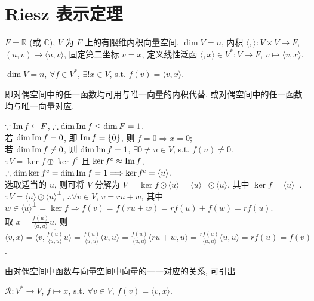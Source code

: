 \documentclass{note}
\begin{document}
\section{Riesz 表示定理}
$F=\mathbb{R}$ (或 $\mathbb{C}$), $V$ 为 $F$ 上的有限维内积向量空间, $\dim V=n$, 内积 $\langle,\rangle:V\times V\rightarrow F$, $(u,v)\mapsto\langle u,v\rangle$, 固定第二坐标 $v=x$, 定义线性泛函 $\langle,x\rangle\in V^*:V\rightarrow F$, $v\mapsto\langle v,x\rangle$.
\begin{thm}\label{thm-9.15}
    $\dim V=n$, $\forall f\in V^*$, $\exists!x\in V$, s.t. $f(v)=\langle v,x\rangle$.
\end{thm}
即对偶空间中的任一函数均可用与唯一向量的内积代替, 或对偶空间中的任一函数均与唯一向量对应.
\begin{pf}
    $\because\operatorname{Im} f\subseteq F$, $\therefore\dim\operatorname{Im} f\leq\dim F=1$.\\
    若 $\dim\operatorname{Im} f=0$, 即 $\operatorname{Im} f=\{0\}$, 则 $f=0\Longrightarrow x=0$;\\
    若 $\dim\operatorname{Im} f\neq 0$, 则 $\dim\operatorname{Im} f=1$, $\exists 0\neq u\in V$, s.t. $f(u)\neq 0$.\\
    $\because V=\ker f\oplus\ker f^c$ 且 $\ker f^c\approx\operatorname{Im} f$, $\therefore\dim\ker f^c=\dim\operatorname{Im} f=1\Longrightarrow\ker f^c=\langle u\rangle$.\\
    选取适当的 $u$, 则可将 $V$ 分解为 $V=\ker f\odot\langle u\rangle=\langle u\rangle^{\perp}\odot\langle u\rangle$, 其中 $\ker f=\langle u\rangle^{\perp}$.\\
    $\because V=\langle u\rangle\odot\langle u\rangle^{\perp}$, $\therefore\forall v\in V$, $v=ru+w$, 其中 $w\in\langle u\rangle^{\perp}=\ker f\Longrightarrow f(v)=f(ru+w)=rf(u)+f(w)=rf(u)$.\\
    取 $x=\frac{\overline{f(u)}}{\langle u,u\rangle}u$, 则 $\langle v,x\rangle=\langle v,\frac{\overline{f(u)}}{\langle u,u\rangle}u\rangle=\frac{f(u)}{\langle u,u\rangle}\langle v,u\rangle=\frac{f(u)}{\langle u,u\rangle}\langle ru+w,u\rangle=\frac{rf(u)}{\langle u,u\rangle}\langle u,u\rangle=rf(u)=f(v)$.
\end{pf}

由对偶空间中函数与向量空间中向量的一一对应的关系, 可引出
\begin{df}[Riesz 映射]
    $\mathcal{R}:V^*\rightarrow V$, $f\mapsto x$, s.t. $\forall v\in V$, $f(v)=\langle v,x\rangle$.
\end{df}
\end{document}
